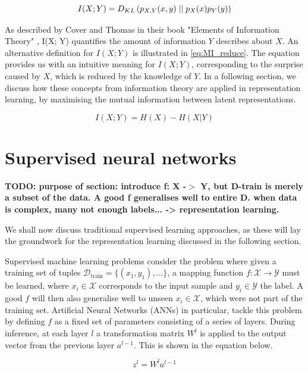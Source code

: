 \begin{equation}
	I(X; Y) =  D_{KL} \left( p_{X, Y}(x, y) \mid \mid p_X(x) p_Y(y) \right)
\end{equation}

As described by Cover and Thomas in their book "Elements of Information Theory" \cite{coverELEMENTSINFORMATIONTHEORY}, I(X; Y) quantifies the amount of information $Y$ describes about $X$. An alternative definition for $I(X;Y)$ is illustrated in \ref{eq:MI_reduce}. The equation provides us with an intuitive meaning for $I(X;Y)$, corresponding to the surprise caused by $X$, which is reduced by the knowledge of $Y$. In a following section, we discuss how these concepts from information theory are applied in representation learning, by maximising the mutual information between latent representations.

\begin{equation}
	I(X;Y)= H(X) - H(X|Y) \label{eq:MI_reduce}
\end{equation}



\section{Supervised neural networks}

\textbf{TODO: purpose of section: introduce f: X -$>$ Y, but D-train is merely a subset of the data. A good f generalises well to entire D. when data is complex, many not enough labels... -> representation learning.}

We shall now discuss traditional supervised learning approaches, as these will lay the groundwork for the representation learning discussed in the following section. 

Supervised machine learning problems consider the problem where given a training set of tuples $\mathcal{D}_{\text{train}} = \{ (x_1, y_1), \dots \}$, a mapping function $f: \mathcal{X} \rightarrow \mathcal{Y}$ must be learned, where $x_i \in \mathcal{X}$ corresponds to the input sample and $y_i \in \mathcal{Y}$ the label. A good $f$ will then also generalise well to unseen $x_i \in \mathcal{X}$, which were not part of the training set. Artificial Neural Networks (ANNs) in particular, tackle this problem by defining $f$ as a fixed set of parameters consisting of a series of layers. During inference, at each layer $l$ a transformation matrix $W^l$ is applied to the output vector from the previous layer $a^{l-1}$. This is shown in the equation below.

$$ z^l = W^l a^{l-1} $$


